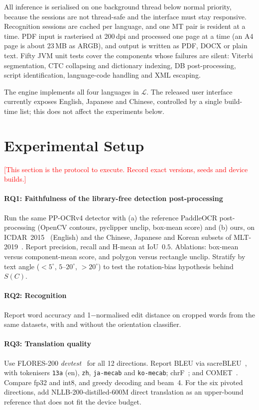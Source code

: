 \documentclass[journal]{IEEEtran}
\newcommand{\note}[1]{\textcolor{red}{[#1]}}
\newcommand{\note}[1]{}
\theoremstyle{definition}
\begin{document}
All inference is serialised on one background thread below normal priority,
because the sessions are not thread-safe and the interface must stay
responsive. Recognition sessions are cached per language, and one MT pair is
resident at a time. PDF input is rasterised at 200\,dpi and processed one page
at a time (an A4 page is about 23\,MB as ARGB), and output is written as PDF,
DOCX or plain text. Fifty JVM unit tests cover the components whose failures
are silent: Viterbi segmentation, CTC collapsing and dictionary indexing, DB
post-processing, script identification, language-code handling and XML
escaping.

The engine implements all four languages in $\mathcal{L}$. The released user
interface currently exposes English, Japanese and Chinese, controlled by a
single build-time list; this does not affect the experiments below.

\section{Experimental Setup}\label{sec:setup}
\note{This section is the protocol to execute. Record exact versions, seeds
and device builds.}

\paragraph{RQ1: Faithfulness of the library-free detection post-processing}
Run the same PP-OCRv4 detector with (a) the reference PaddleOCR
post-processing (OpenCV contours, pyclipper unclip, box-mean score) and (b)
ours, on ICDAR~2015~\cite{karatzas2015icdar} (English) and the Chinese,
Japanese and Korean subsets of MLT-2019~\cite{nayef2019mlt}. Report precision,
recall and H-mean at IoU~$0.5$. Ablations: box-mean versus component-mean
score, and polygon versus rectangle unclip. Stratify by text angle
($<5^\circ$, $5$--$20^\circ$, $>20^\circ$) to test the rotation-bias
hypothesis behind $S(C)$.

\paragraph{RQ2: Recognition}
Report word accuracy and 1$-$normalised edit distance on cropped words from the
same datasets, with and without the orientation classifier.

\paragraph{RQ3: Translation quality}
Use FLORES-200 \emph{devtest}~\cite{nllb2022} for all 12 directions. Report
BLEU via sacreBLEU~\cite{papineni2002bleu,post2018sacrebleu}, with tokenisers
\texttt{13a} (en), \texttt{zh}, \texttt{ja-mecab} and \texttt{ko-mecab};
chrF~\cite{popovic2015chrf}; and COMET~\cite{rei2020comet}. Compare fp32 and
int8, and greedy decoding and beam~4. For the six pivoted directions, add
NLLB-200-distilled-600M direct translation as an upper-bound reference that
does not fit the device budget.
\end{document}
